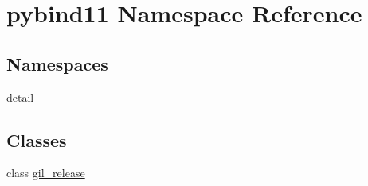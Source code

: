 \hypertarget{namespacepybind11}{}\section{pybind11 Namespace Reference}
\label{namespacepybind11}
\subsection*{Namespaces}
\begin{DoxyCompactItemize}
\item 
 \hyperlink{namespacepybind11_1_1detail}{detail}
\end{DoxyCompactItemize}
\subsection*{Classes}
\begin{DoxyCompactItemize}
\item 
class \hyperlink{classpybind11_1_1gil__release}{gil\+\_\+release}
\end{DoxyCompactItemize}

